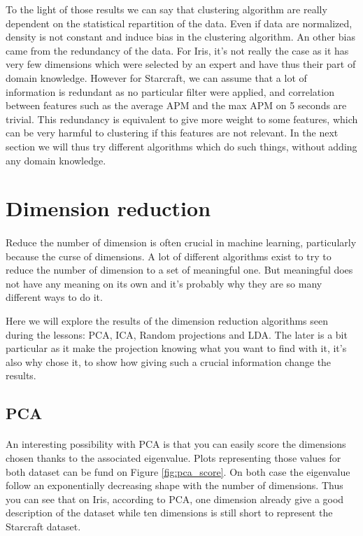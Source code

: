 \documentclass[twocolumn,a4paper,10pt]{article}
\begin{document}
To the light of those results we can say that clustering algorithm are really dependent on the statistical repartition of the data. Even if data are normalized, density is not constant and induce bias in the clustering algorithm. An other bias came from the redundancy of the data. For Iris, it's not really the case as it has very few dimensions which were selected by an expert and have thus their part of domain knowledge. However for Starcraft, we can assume that a lot of information is redundant as no particular filter were applied, and correlation between features such as the average APM and the max APM on 5 seconds are trivial. This redundancy is equivalent to give more weight to some features, which can be very harmful to clustering if this features are not relevant. In the next section we will thus try different algorithms which do such things, without adding any domain knowledge.


\section{Dimension reduction}
\paragraph{}
Reduce the number of dimension is often crucial in machine learning, particularly because the curse of dimensions. A lot of different algorithms exist to try to reduce the number of dimension to a set of meaningful one. But meaningful does not have any meaning on its own and it's probably why they are so many different ways to do it.

Here we will explore the results of the dimension reduction algorithms seen during the lessons: PCA, ICA, Random projections and LDA. The later is a bit particular as it make the projection knowing what you want to find with it, it's also why chose it, to show how giving such a crucial information change the results.

\subsection{PCA}
\paragraph{}
An interesting possibility with PCA is that you can easily score the dimensions chosen thanks to the associated eigenvalue. Plots representing those values for both dataset can be fund on Figure \ref{fig:pca_score}. On both case the eigenvalue follow an exponentially decreasing shape with the number of dimensions. Thus you can see that on Iris, according to PCA, one dimension already give a good description of the dataset while ten dimensions is still short to represent the Starcraft dataset.
\end{document}
